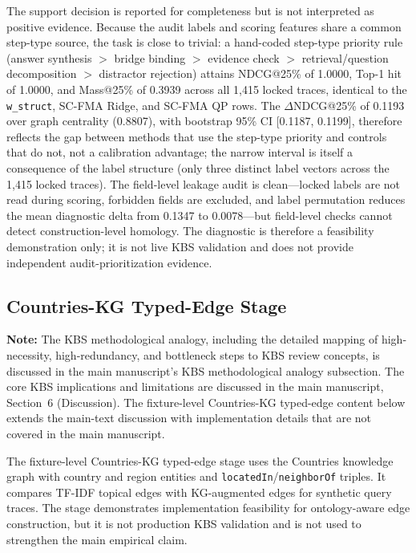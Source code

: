 \documentclass[a4paper,fleqn]{cas-sc}
\begin{document}
The support decision is reported for completeness but is not interpreted as positive evidence. Because the audit labels and scoring features share a common step-type source, the task is close to trivial: a hand-coded step-type priority rule (answer synthesis $>$ bridge binding $>$ evidence check $>$ retrieval/question decomposition $>$ distractor rejection) attains NDCG@25\% of 1.0000, Top-1 hit of 1.0000, and Mass@25\% of 0.3939 across all 1,415 locked traces, identical to the \texttt{w\_struct}, SC-FMA Ridge, and SC-FMA QP rows. The $\Delta$NDCG@25\% of 0.1193 over graph centrality (0.8807), with bootstrap 95\% CI [0.1187, 0.1199], therefore reflects the gap between methods that use the step-type priority and controls that do not, not a calibration advantage; the narrow interval is itself a consequence of the label structure (only three distinct label vectors across the 1,415 locked traces). The field-level leakage audit is clean---locked labels are not read during scoring, forbidden fields are excluded, and label permutation reduces the mean diagnostic delta from 0.1347 to 0.0078---but field-level checks cannot detect construction-level homology. The diagnostic is therefore a feasibility demonstration only; it is not live KBS validation and does not provide independent audit-prioritization evidence.

\subsection{Countries-KG Typed-Edge Stage}
\label{app:kbs-integration-kg}

\noindent\textbf{Note:} The KBS methodological analogy, including the detailed mapping of high-necessity, high-redundancy, and bottleneck steps to KBS review concepts, is discussed in the main manuscript's KBS methodological analogy subsection. The core KBS implications and limitations are discussed in the main manuscript, Section~6 (Discussion). The fixture-level Countries-KG typed-edge content below extends the main-text discussion with implementation details that are not covered in the main manuscript.

The fixture-level Countries-KG typed-edge stage uses the Countries knowledge graph with country and region entities and \texttt{locatedIn}/\texttt{neighborOf} triples. It compares TF-IDF topical edges with KG-augmented edges for synthetic query traces. The stage demonstrates implementation feasibility for ontology-aware edge construction, but it is not production KBS validation and is not used to strengthen the main empirical claim.
\end{document}
